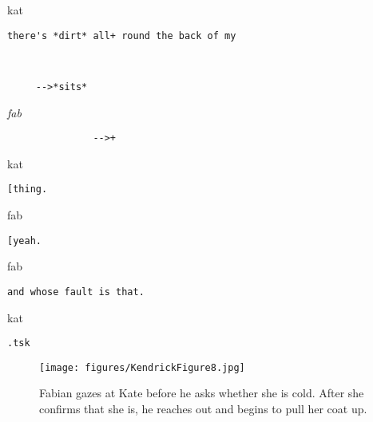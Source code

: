 \documentclass[output=paper,nonflat,modfont,draft]{langsci/langscibook}
\begin{document}
\begin{transbox}{16}{kat}
\begin{verbatim}
there's *dirt* all+ round the back of my
\end{verbatim}
\end{transbox}

\begin{transbox}{17}{~}
\begin{verbatim}
     -->*sits*
\end{verbatim}
\end{transbox}

\begin{transbox}{18}{\textit{fab}}
\begin{verbatim}
               -->+
\end{verbatim}
\end{transbox}


\begin{transbox}{20}{kat}
\begin{verbatim}
[thing.
\end{verbatim}
\end{transbox}

\begin{transbox}{21}{fab}
\begin{verbatim}
[yeah.
\end{verbatim}
\end{transbox}


\begin{transbox}{23}{fab}
\begin{verbatim}
and whose fault is that.
\end{verbatim}
\end{transbox}


\begin{transbox}{25}{kat}
\begin{verbatim}
.tsk
\end{verbatim}
\end{transbox}\bigskip

\begin{figure}
\caption{Fabian gazes at Kate before he asks whether she is cold. After she confirms that she is, he reaches out and begins to pull her coat up.}
\texttt{[image: figures/KendrickFigure8.jpg]}
\label{fig:kendrick:8}
\end{figure}
\end{document}
